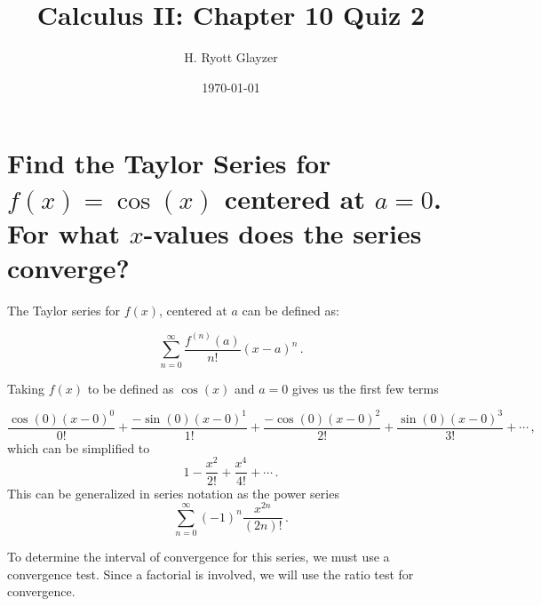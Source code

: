\documentclass[12pt, letterpaper]{article}
\begin{document}
\title{Calculus II\@: Chapter 10 Quiz 2}
\author{H. Ryott Glayzer}
\date{\today}


\maketitle


\section{Find the Taylor Series for $f(x) = \cos{(x)}$ centered at $a=0$.
	For what $x$-values does the series converge?}

The Taylor series for $f(x)$, centered at $a$ can be defined as: 

\begin{equation}
	\sum_{n=0}^{\infty} \frac{f^{(n)}(a)}{n!} {(x-a)}^{n}\,.	
\end{equation}

Taking $f(x)$ to be defined as $\cos{(x)}$ and $a = 0$ gives us the first few terms

\begin{equation}
	\frac{\cos{(0)}{{(x-0)}^{0}}}{0!} +
	\frac{-\sin{(0)}{(x-0)}^{1}}{1!} +
	\frac{-\cos{(0)}{(x-0)}^{2}}{2!} +
	\frac{\sin{(0)}{(x-0)}^{3}}{3!} + \cdots \,,
\end{equation}
which can be simplified to
\begin{equation}
	1 - \frac{x^{2}}{2!} + \frac{x^{4}}{4!} + \cdots \,.
\end{equation}
This can be generalized in series notation as the power series
\begin{equation}
	\sum_{n=0}^{\infty} {(-1)}^{n}\frac{x^{2n}}{(2n)!} \,.
\end{equation}

To determine the interval of convergence for this series, we must use
a convergence test.
Since a factorial is involved, we will use the ratio test for convergence.
\end{document}
